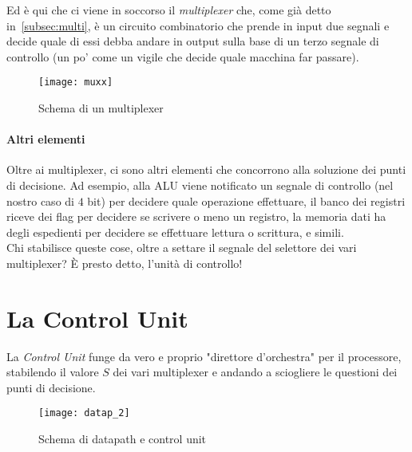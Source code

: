Ed è qui che ci viene in soccorso il \emph{multiplexer} che, come già detto in~\ref{subsec:multi}, è un circuito combinatorio che prende in input due segnali e decide quale di essi debba andare in output sulla base di un terzo segnale di controllo (un po' come un vigile che decide quale macchina far passare).
\begin{figure}[H]
	\centering
	\texttt{[image: muxx]}
	\caption{Schema di un multiplexer}
\end{figure}
\paragraph{Altri elementi}
Oltre ai multiplexer, ci sono altri elementi che concorrono alla soluzione dei punti di decisione. Ad esempio, alla ALU viene notificato un segnale di controllo (nel nostro caso di \(4\) bit) per decidere quale operazione effettuare, il banco dei registri riceve dei flag per decidere se scrivere o meno un registro, la memoria dati ha degli espedienti per decidere se effettuare lettura o scrittura, e simili.\\
Chi stabilisce queste cose, oltre a settare il segnale del selettore dei vari multiplexer? È presto detto, l’unità di controllo!

\section{La Control Unit}
La \emph{Control Unit} funge da vero e proprio "direttore d'orchestra" per il processore, stabilendo il valore \(S\) dei vari multiplexer e andando a sciogliere le questioni dei punti di decisione.
\begin{figure}[H]
	\centering
	\texttt{[image: datap\_2]}
	\caption{Schema di datapath e control unit}
\end{figure}

